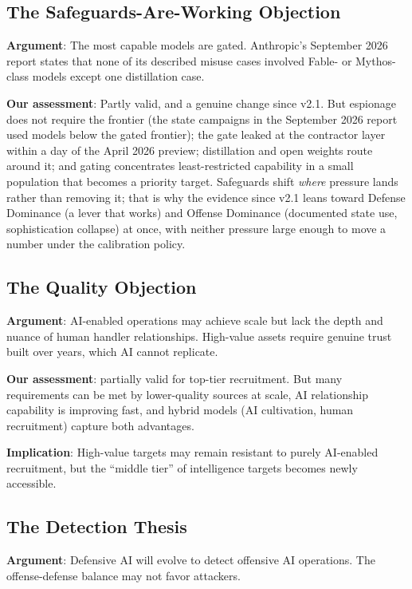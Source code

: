 \documentclass[11pt,letterpaper]{article}
\begin{document}
\subsection{The Safeguards-Are-Working Objection}

\textbf{Argument}: The most capable models are gated. Anthropic's September 2026 report states that none of its described misuse cases involved Fable- or Mythos-class models except one distillation case.

\textbf{Our assessment}: Partly valid, and a genuine change since v2.1. But espionage does not require the frontier (the state campaigns in the September 2026 report used models below the gated frontier); the gate leaked at the contractor layer within a day of the April 2026 preview; distillation and open weights route around it; and gating concentrates least-restricted capability in a small population that becomes a priority target. Safeguards shift \textit{where} pressure lands rather than removing it; that is why the evidence since v2.1 leans toward Defense Dominance (a lever that works) and Offense Dominance (documented state use, sophistication collapse) at once, with neither pressure large enough to move a number under the calibration policy.

\subsection{The Quality Objection}

\textbf{Argument}: AI-enabled operations may achieve scale but lack the depth and nuance of human handler relationships. High-value assets require genuine trust built over years, which AI cannot replicate.

\textbf{Our assessment}: partially valid for top-tier recruitment. But many requirements can be met by lower-quality sources at scale, AI relationship capability is improving fast, and hybrid models (AI cultivation, human recruitment) capture both advantages.

\textbf{Implication}: High-value targets may remain resistant to purely AI-enabled recruitment, but the ``middle tier'' of intelligence targets becomes newly accessible.

\subsection{The Detection Thesis}

\textbf{Argument}: Defensive AI will evolve to detect offensive AI operations. The offense-defense balance may not favor attackers.
\end{document}
